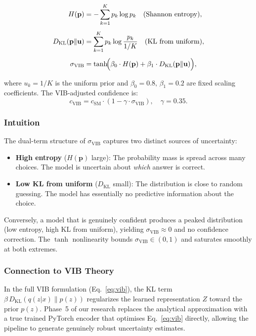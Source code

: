 \documentclass[conference]{IEEEtran}
\begin{document}
\begin{align}
    H(\mathbf{p}) &= -\sum_{k=1}^{K} p_k \log p_k
        \quad\text{(Shannon entropy)},
    \label{eq:entropy} \\[4pt]
    D_{\text{KL}}(\mathbf{p} \| \mathbf{u}) &=
        \sum_{k=1}^{K} p_k \log \frac{p_k}{1/K}
        \quad\text{(KL from uniform)},
    \label{eq:kl_uniform}\\[4pt]
    \sigma_{\text{VIB}} &=
        \tanh\!\Bigl(\beta_0 \cdot H(\mathbf{p})
        + \beta_1 \cdot D_{\text{KL}}(\mathbf{p} \| \mathbf{u})\Bigr),
    \label{eq:vib_sigma}
\end{align}

where $u_k = 1/K$ is the uniform prior and
$\beta_0=0.8,\,\beta_1=0.2$ are fixed scaling coefficients.
The VIB-adjusted confidence is:
\begin{equation}
    c_{\text{VIB}} = c_{\text{SM}} \cdot (1 - \gamma \cdot \sigma_{\text{VIB}}),
    \quad \gamma = 0.35.
    \label{eq:vib_conf}
\end{equation}

\subsubsection{Intuition}

The dual-term structure of $\sigma_{\text{VIB}}$ captures two
distinct sources of uncertainty:
\begin{itemize}[leftmargin=*]
    \item \textbf{High entropy} ($H(\mathbf{p})$ large): The
          probability mass is spread across many choices. The model
          is uncertain about \emph{which} answer is correct.
    \item \textbf{Low KL from uniform} ($D_{\text{KL}}$ small):
          The distribution is close to random guessing. The model
          has essentially no predictive information about the choice.
\end{itemize}
Conversely, a model that is genuinely confident produces a peaked
distribution (low entropy, high KL from uniform), yielding
$\sigma_{\text{VIB}}\approx0$ and no confidence correction.
The $\tanh$ nonlinearity bounds $\sigma_{\text{VIB}}\in(0,1)$ and
saturates smoothly at both extremes.

\subsubsection{Connection to VIB Theory}

In the full VIB formulation (Eq.~\ref{eq:vib}), the KL term
$\beta\,D_{\text{KL}}(q(z|x)\|p(z))$ regularizes the learned
representation $Z$ toward the prior $p(z)$. Phase~5 of our research replaces
the analytical approximation with a true trained PyTorch encoder that
optimises Eq.~\ref{eq:vib} directly, allowing the pipeline to generate
genuinely robust uncertainty estimates.
\end{document}
